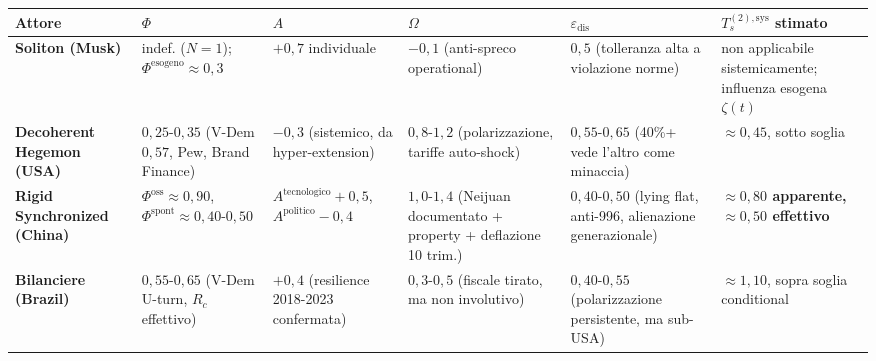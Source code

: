 {\def\LTcaptype{none} %
{\small\begin{longtable}[]{@{}
  >{\raggedright\arraybackslash}p{}
  >{\raggedright\arraybackslash}p{}
  >{\raggedright\arraybackslash}p{}
  >{\raggedright\arraybackslash}p{}
  >{\raggedright\arraybackslash}p{}
  >{\raggedright\arraybackslash}p{}@{}}
\toprule\noalign{}
\begin{minipage}[b]{\linewidth}\raggedright
Attore
\end{minipage} & \begin{minipage}[b]{\linewidth}\raggedright
\(\Phi\)
\end{minipage} & \begin{minipage}[b]{\linewidth}\raggedright
\(A\)
\end{minipage} & \begin{minipage}[b]{\linewidth}\raggedright
\(\Omega\)
\end{minipage} & \begin{minipage}[b]{\linewidth}\raggedright
\(\varepsilon_{\text{dis}}\)
\end{minipage} & \begin{minipage}[b]{\linewidth}\raggedright
\(T_s^{(2),\text{sys}}\) stimato
\end{minipage} \\
\midrule\noalign{}
\endhead
\bottomrule\noalign{}
\endlastfoot
\textbf{Soliton (Musk)} & indef. (\(N=1\));
\(\Phi^{\text{esogeno}} \approx 0{,}3\) & \(+0{,}7\) individuale &
\(-0{,}1\) (anti-spreco operational) & \(0{,}5\) (tolleranza alta a
violazione norme) & non applicabile sistemicamente; influenza esogena
\(\zeta(t)\) \\
\textbf{Decoherent Hegemon (USA)} & \(0{,}25\)-\(0{,}35\) (V-Dem
\(0{,}57\), Pew, Brand Finance) & \(-0{,}3\) (sistemico, da
hyper-extension) & \(0{,}8\)-\(1{,}2\) (polarizzazione, tariffe
auto-shock) & \(0{,}55\)-\(0{,}65\) (40\%+ vede l'altro come minaccia) &
\textbf{\(\approx 0{,}45\)}, sotto soglia \\
\textbf{Rigid Synchronized (China)} &
\(\Phi^{\text{oss}} \approx 0{,}90\),
\(\Phi^{\text{spont}} \approx 0{,}40\)-\(0{,}50\) &
\(A^{\text{tecnologico}} +0{,}5\), \(A^{\text{politico}} -0{,}4\) &
\(1{,}0\)-\(1{,}4\) (Neijuan documentato + property + deflazione 10
trim.) & \(0{,}40\)-\(0{,}50\) (lying flat, anti-996, alienazione
generazionale) & \textbf{\(\approx 0{,}80\) apparente,
\(\approx 0{,}50\) effettivo} \\
\textbf{Bilanciere (Brazil)} & \(0{,}55\)-\(0{,}65\) (V-Dem U-turn,
\(R_c\) effettivo) & \(+0{,}4\) (resilience 2018-2023 confermata) &
\(0{,}3\)-\(0{,}5\) (fiscale tirato, ma non involutivo) &
\(0{,}40\)-\(0{,}55\) (polarizzazione persistente, ma sub-USA) &
\textbf{\(\approx 1{,}10\)}, sopra soglia conditional \\
\end{longtable}}
}

